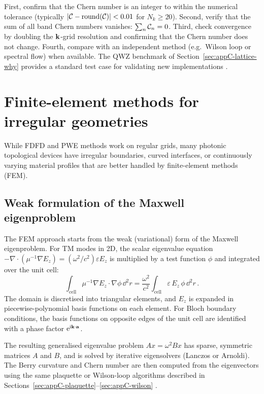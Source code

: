 First, confirm that the Chern number is an integer to within the
numerical tolerance (typically $|\mathcal{C}-\mathrm{round}(\mathcal{C})|<0.01$
for $N_k\geq 20$).  Second, verify that the sum of all band Chern
numbers vanishes: $\sum_n\mathcal{C}_n=0$.  Third, check convergence by
doubling the $\mathbf{k}$-grid resolution and confirming that the Chern
number does not change.  Fourth, compare with an independent method
(e.g.\ Wilson loop or spectral flow) when available.  The QWZ
benchmark of Section~\ref{sec:appC-lattice-why} provides a standard test
case for validating new implementations
\cite{ozawa2018topological,gangaraj2016berry}.


\section{Finite-element methods for irregular geometries}
\label{sec:appC-fem}

While FDFD and PWE methods work on regular grids, many photonic
topological devices have irregular boundaries, curved interfaces, or
continuously varying material profiles that are better handled by
finite-element methods (FEM).

\subsection{Weak formulation of the Maxwell eigenproblem}
\label{sec:appC-fem-weak}

The FEM approach starts from the weak (variational) form of the
Maxwell eigenproblem.  For TM modes in 2D, the scalar eigenvalue
equation $-\nabla\cdot(\mu^{-1}\nabla E_z)=(\omega^2/c^2)\varepsilon E_z$
is multiplied by a test function $\phi$ and integrated over the unit
cell:
\begin{equation}\label{eq:appC-fem-weak}
  \int_{\mathrm{cell}}\mu^{-1}\nabla E_z\cdot\nabla\phi\,\dd^2 r
  = \frac{\omega^2}{c^2}\int_{\mathrm{cell}}\varepsilon\,E_z\,\phi
  \,\dd^2 r\,.
\end{equation}
The domain is discretised into triangular elements, and $E_z$ is
expanded in piecewise-polynomial basis functions on each element.
For Bloch boundary conditions, the basis functions on opposite edges
of the unit cell are identified with a phase factor $\mathrm{e}^{\mathrm{i}\mathbf{k}\cdot\mathbf{a}}$.

The resulting generalised eigenvalue problem $Ax=\omega^2 Bx$ has
sparse, symmetric matrices $A$ and $B$, and is solved by iterative
eigensolvers (Lanczos or Arnoldi).  The Berry curvature and Chern
number are then computed from the eigenvectors using the same
plaquette or Wilson-loop algorithms described in
Sections~\ref{sec:appC-plaquette}--\ref{sec:appC-wilson}
\cite{ozawa2018topological,gangaraj2016berry}.

